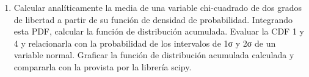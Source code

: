 \documentclass[a4paper,11pt]{article}
\begin{document}
\begin{enumerate}
\item Calcular analíticamente la media de una variable chi-cuadrado de dos grados de libertad a partir de su función de densidad de probabilidad. Integrando esta PDF, calcular la función de distribución acumulada. Evaluar la CDF 1 y 4 y relacionarla con la probabilidad de los intervalos de 1σ y 2σ de un variable normal. Graficar la función de distribución acumulada calculada y compararla con la provista por la librería scipy.










 

\end{enumerate}
\end{document}

